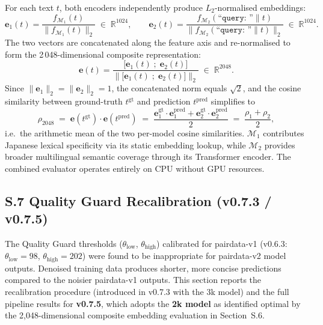 ﻿\documentclass[onecolumn]{article}
\begin{document}
\noindent
For each text $t$, both encoders independently produce $L_2$-normalised embeddings:
\begin{equation}
  \mathbf{e}_1(t) =
    \frac{f_{\mathcal{M}_1}(t)}{\bigl\|f_{\mathcal{M}_1}(t)\bigr\|_2}
    \;\in\;\mathbb{R}^{1024},
  \qquad
  \mathbf{e}_2(t) =
    \frac{f_{\mathcal{M}_2}(\texttt{``query:\ ''}\!\parallel\!t)}
         {\bigl\|f_{\mathcal{M}_2}(\texttt{``query:\ ''}\!\parallel\!t)\bigr\|_2}
    \;\in\;\mathbb{R}^{1024}.
  \label{eq:e1e2}
\end{equation}
The two vectors are concatenated along the feature axis and re-normalised
to form the 2\,048-dimensional composite representation:
\begin{equation}
  \mathbf{e}(t) =
    \frac{\bigl[\mathbf{e}_1(t)\;;\;\mathbf{e}_2(t)\bigr]}
         {\bigl\|\bigl[\mathbf{e}_1(t)\;;\;\mathbf{e}_2(t)\bigr]\bigr\|_2}
    \;\in\;\mathbb{R}^{2048}.
  \label{eq:concat}
\end{equation}
Since $\|\mathbf{e}_1\|_2 = \|\mathbf{e}_2\|_2 = 1$, the concatenated
norm equals $\sqrt{2}$, and the cosine similarity between ground-truth
$t^{\mathrm{gt}}$ and prediction $t^{\mathrm{pred}}$ simplifies to
\begin{equation}
  \rho_{2048}
    \;=\; \mathbf{e}(t^{\mathrm{gt}})\cdot\mathbf{e}(t^{\mathrm{pred}})
    \;=\; \frac{
      \mathbf{e}_1^{\mathrm{gt}}\cdot\mathbf{e}_1^{\mathrm{pred}}
      + \mathbf{e}_2^{\mathrm{gt}}\cdot\mathbf{e}_2^{\mathrm{pred}}
    }{2}
    \;=\; \frac{\rho_1 + \rho_2}{2},
  \label{eq:rho2048}
\end{equation}
i.e.\ the arithmetic mean of the two per-model cosine similarities.
$\mathcal{M}_1$ contributes Japanese lexical specificity
via its static embedding lookup, while $\mathcal{M}_2$ provides
broader multilingual semantic coverage through its Transformer encoder.
The combined evaluator operates entirely on CPU without GPU resources.

\subsection*{S.7 Quality Guard Recalibration (v0.7.3 / v0.7.5)}

\noindent
The Quality Guard thresholds ($\theta_{\text{low}}$, $\theta_{\text{high}}$)
calibrated for pairdata-v1 (v0.6.3: $\theta_{\text{low}}=98$,
$\theta_{\text{high}}=202$) were found to be inappropriate for
pairdata-v2 model outputs.
Denoised training data produces shorter, more concise predictions
compared to the noisier pairdata-v1 outputs.
This section reports the recalibration procedure (introduced in v0.7.3 with
the 3k model) and the full pipeline results for \textbf{v0.7.5}, which
adopts the \textbf{2k model} as identified optimal by the
2{,}048-dimensional composite embedding evaluation in Section~S.6.
\end{document}
